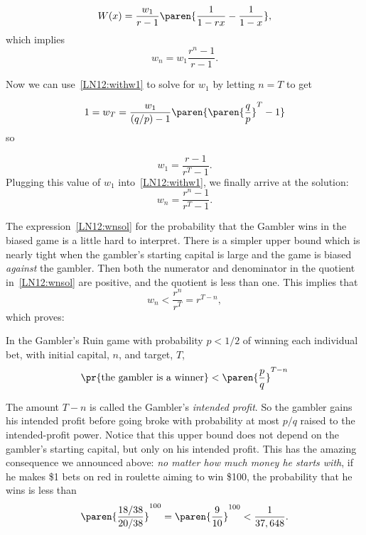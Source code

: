\[
W(x) = \frac{w_1}{r-1} \paren{\frac{1}{1-rx} - \frac{1}{1-x}},
\]
which implies
\begin{equation}\label{LN12:withw1}
w_n = w_1\frac{r^n - 1}{r-1}.
\end{equation}

Now we can use~\eqref{LN12:withw1} to solve for $w_1$ by letting $n=T$ to get
\begin{staffnotes}

\[
1=w_T = \frac{w_1}{(q/p)-1}\paren{\paren{\frac{q}{p}}^T - 1}
\]
so
\end{staffnotes}

\[
w_1= \frac{r - 1}{r^T-1}.
\]
Plugging this value of $w_1$ into~\eqref{LN12:withw1}, we finally arrive at
the solution:
\begin{equation}\label{LN12:wnsol}
w_n = \frac{r^n-1}{r^T -1}. 
\end{equation}

The expression~\eqref{LN12:wnsol} for the probability that the Gambler wins
in the biased game is a little hard to interpret.  There is a simpler
upper bound which is nearly tight when the gambler's starting capital is
large and the game is biased {\em against} the
gambler.  Then both the numerator and denominator in the quotient
in~\eqref{LN12:wnsol} are positive, and the quotient is less than one.  This
implies that
\[
w_n < \frac{r^n}{r^T} = r^{T-n}, 
\]
which proves:
\begin{corollary}\label{LN12:biaswincor}
  In the Gambler's Ruin game with probability $p< 1/2$ of winning each
  individual bet, with initial capital, $n$, and target, $T$,
\begin{equation}\label{LN12:biaswinsimp}
\pr{\text{the gambler is a winner}} < \paren{\frac{p}{q}}^{T-n}
\end{equation}
\end{corollary}

The amount $T-n$ is called the Gambler's \emph{intended profit}.  So the
gambler gains his intended profit before going broke with probability at
most $p/q$ raised to the intended-profit power.  Notice that this upper
bound does not depend on the gambler's starting capital, but only on his
intended profit.  This has the amazing consequence we announced above:
\emph{no matter how much money he starts with}, if he
makes \$1 bets on red in roulette aiming to win \$100, the
probability that he wins is less than
\[
\paren{\frac{18/38}{20/38}}^{100} = \paren{\frac{9}{10}}^{100} < \frac{1}{37,648}.
\]

